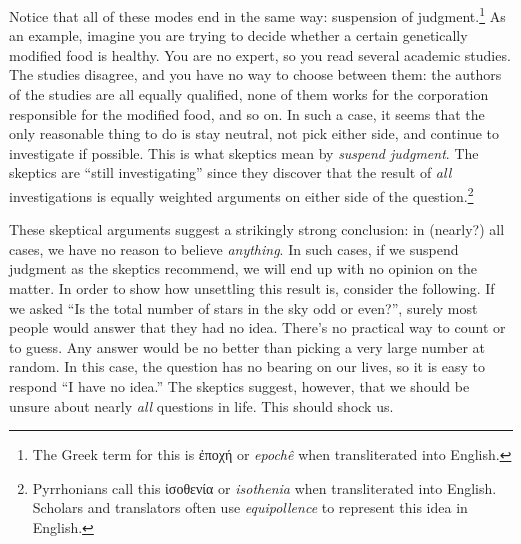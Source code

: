 Notice that all of these modes end in the same way: suspension of judgment.\footnote{The Greek term for this is \textgreek{ἐποχή} or \textit{epochê} when transliterated into English.} As an example, imagine you are trying to decide whether a certain genetically modified food is healthy. You are no expert, so you read several academic studies. The studies disagree, and you have no way to choose between them: the authors of the studies are all equally qualified, none of them works for the corporation responsible for the modified food, and so on. In such a case, it seems that the only reasonable thing to do is stay neutral, not pick either side, and continue to investigate if possible. This is what skeptics mean by \textit{suspend judgment}. The skeptics are ``still investigating'' since they discover that the result of \textit{all} investigations is equally weighted arguments on either side of the question.\footnote{Pyrrhonians call this \textgreek{ἰσοθενία} or \textit{isothenia} when transliterated into English. Scholars and translators often use \textit{equipollence} to represent this idea in English.}

These skeptical arguments suggest a strikingly strong conclusion: in (nearly?) all cases, we have no reason to believe \textit{anything}. In such cases, if we suspend judgment as the skeptics recommend, we will end up with no opinion on the matter. In order to show how unsettling this result is, consider the following. If we asked ``Is the total number of stars in the sky odd or even?'', surely most people would answer that they had no idea. There's no practical way to count or to guess. Any answer would be no better than picking a very large number at random. In this case, the question has no bearing on our lives, so it is easy to respond ``I have no idea.'' The skeptics suggest, however, that we should be unsure about nearly \textit{all} questions in life. This should shock us.

